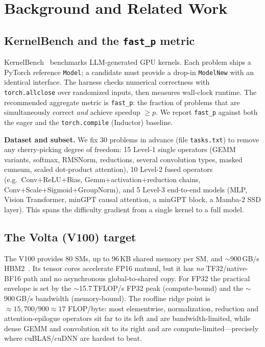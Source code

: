 \documentclass[conference]{IEEEtran}
\begin{document}
\section{Background and Related Work}
\subsection{KernelBench and the \texttt{fast\_p} metric}
KernelBench~\cite{kernelbench} benchmarks LLM-generated GPU kernels. Each
problem ships a PyTorch reference \texttt{Model}; a candidate must provide a
drop-in \texttt{ModelNew} with an identical interface. The harness checks
numerical correctness with \texttt{torch.allclose} over randomized inputs, then
measures wall-clock runtime. The recommended aggregate metric is
\texttt{fast\_p}: the fraction of problems that are simultaneously correct
\emph{and} achieve speedup $\ge p$. We report \texttt{fast\_p} against both the
eager and the \texttt{torch.compile} (Inductor) baseline.

\textbf{Dataset and subset.} We fix 30 problems in advance (file
\texttt{tasks.txt}) to remove any cherry-picking degree of freedom: 15 Level-1
single operators (GEMM variants, softmax, RMSNorm, reductions, several
convolution types, masked cumsum, scaled dot-product attention), 10 Level-2
fused operators (e.g.\ Conv+ReLU+Bias, Gemm+activation+reduction chains,
Conv+Scale+Sigmoid+GroupNorm), and 5 Level-3 end-to-end models (MLP, Vision
Transformer, minGPT causal attention, a minGPT block, a Mamba-2 SSD layer).
This spans the difficulty gradient from a single kernel to a full model.

\subsection{The Volta (V100) target}
The V100 provides 80 SMs, up to 96\,KB shared memory per SM, and $\sim$900\,GB/s
HBM2~\cite{volta}. Its tensor cores accelerate FP16 matmul, but it has \emph{no}
TF32/native-BF16 path and no asynchronous global-to-shared copy. For FP32 the
practical envelope is set by the $\sim$15.7\,TFLOP/s FP32 peak (compute-bound)
and the $\sim$900\,GB/s bandwidth (memory-bound). The roofline ridge point is
$\approx 15{,}700/900 \approx 17$ FLOP/byte: most elementwise, normalization,
reduction and attention-epilogue operators sit far to its left and are
bandwidth-limited, while dense GEMM and convolution sit to its right and are
compute-limited---precisely where cuBLAS/cuDNN are hardest to beat.
\end{document}
